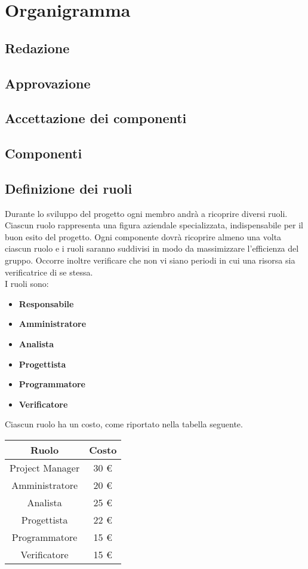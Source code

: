 \section{Organigramma}
	\subsection{Redazione}
	\subsection{Approvazione}
	\subsection{Accettazione dei componenti}
	\subsection{Componenti}
	\subsection{Definizione dei ruoli}
		Durante lo sviluppo del progetto ogni membro andrà a ricoprire diversi ruoli. Ciascun ruolo rappresenta una figura 		aziendale specializzata, indispensabile per il buon esito del progetto. Ogni componente dovrà ricoprire almeno una volta 		ciascun ruolo e i ruoli saranno suddivisi in modo da massimizzare l'efficienza del gruppo. Occorre inoltre verificare 		che non vi siano periodi in cui una risorsa sia verificatrice di se stessa. \\
		I ruoli sono:
		\begin{itemize}
			\item \textbf{Responsabile} \\
			\item \textbf{Amministratore} \\
			\item \textbf{Analista} \\
			\item \textbf{Progettista} \\
			\item \textbf{Programmatore} \\
			\item \textbf{Verificatore} \\
		\end{itemize}
		Ciascun ruolo ha un costo, come riportato nella tabella seguente. \\
		\begin{table}[H]
		\centering
		\begin{tabular}{|c|c|}
			\hline
			\textbf{Ruolo}		& \textbf{Costo} \\
			\hline
			Project Manager		& 30 €\\
			Amministratore		& 20 €\\
			Analista			& 25 €\\
			Progettista			& 22 €\\
			Programmatore		& 15 €\\
			Verificatore		& 15 €\\
			\hline
		\end{tabular}
		\end{table}
